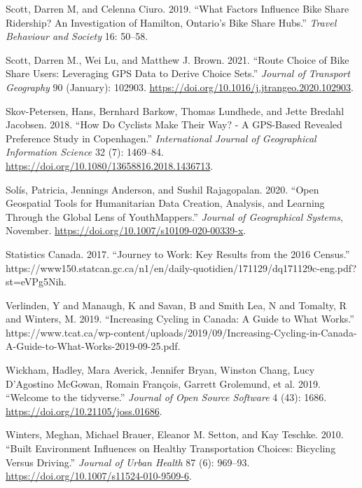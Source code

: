\documentclass[smallextended]{svjour3}       %
\begin{document}
\leavevmode\hypertarget{ref-Scott2019factors}{}%
Scott, Darren M, and Celenna Ciuro. 2019. ``What Factors Influence Bike
Share Ridership? An Investigation of Hamilton, Ontario's Bike Share
Hubs.'' \emph{Travel Behaviour and Society} 16: 50--58.

\leavevmode\hypertarget{ref-scottRouteChoiceBike2021}{}%
Scott, Darren M., Wei Lu, and Matthew J. Brown. 2021. ``Route Choice of
Bike Share Users: Leveraging GPS Data to Derive Choice Sets.''
\emph{Journal of Transport Geography} 90 (January): 102903.
\url{https://doi.org/10.1016/j.jtrangeo.2020.102903}.

\leavevmode\hypertarget{ref-SkovPetersen2018}{}%
Skov-Petersen, Hans, Bernhard Barkow, Thomas Lundhede, and Jette Bredahl
Jacobsen. 2018. ``How Do Cyclists Make Their Way? - A GPS-Based Revealed
Preference Study in Copenhagen.'' \emph{International Journal of
Geographical Information Science} 32 (7): 1469--84.
\url{https://doi.org/10.1080/13658816.2018.1436713}.

\leavevmode\hypertarget{ref-solisOpenGeospatialTools2020}{}%
Solís, Patricia, Jennings Anderson, and Sushil Rajagopalan. 2020. ``Open
Geospatial Tools for Humanitarian Data Creation, Analysis, and Learning
Through the Global Lens of YouthMappers.'' \emph{Journal of Geographical
Systems}, November. \url{https://doi.org/10.1007/s10109-020-00339-x}.

\leavevmode\hypertarget{ref-Statscan2017}{}%
Statistics Canada. 2017. ``Journey to Work: Key Results from the 2016
Census.''
https://www150.statcan.gc.ca/n1/en/daily-quotidien/171129/dq171129c-eng.pdf?st=eVPg5Nih.

\leavevmode\hypertarget{ref-Verlinden2019}{}%
Verlinden, Y and Manaugh, K and Savan, B and Smith Lea, N and Tomalty, R
and Winters, M. 2019. ``Increasing Cycling in Canada: A Guide to What
Works.''
https://www.tcat.ca/wp-content/uploads/2019/09/Increasing-Cycling-in-Canada-A-Guide-to-What-Works-2019-09-25.pdf.

\leavevmode\hypertarget{ref-Wickham2019}{}%
Wickham, Hadley, Mara Averick, Jennifer Bryan, Winston Chang, Lucy
D'Agostino McGowan, Romain François, Garrett Grolemund, et al. 2019.
``Welcome to the tidyverse.'' \emph{Journal of Open Source Software} 4
(43): 1686. \url{https://doi.org/10.21105/joss.01686}.

\leavevmode\hypertarget{ref-Winters2010}{}%
Winters, Meghan, Michael Brauer, Eleanor M. Setton, and Kay Teschke.
2010. ``Built Environment Influences on Healthy Transportation Choices:
Bicycling Versus Driving.'' \emph{Journal of Urban Health} 87 (6):
969--93. \url{https://doi.org/10.1007/s11524-010-9509-6}.
\end{document}
